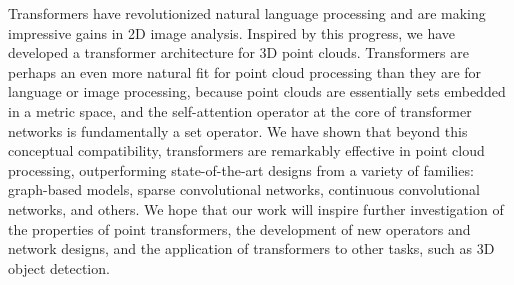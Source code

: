 Transformers have revolutionized natural language processing and are making impressive gains in 2D image analysis. Inspired by this progress, we have developed a transformer architecture for 3D point clouds. Transformers are perhaps an even more natural fit for point cloud processing than they are for language or image processing, because point clouds are essentially sets embedded in a metric space, and the self-attention operator at the core of transformer networks is fundamentally a set operator. We have shown that beyond this conceptual compatibility, transformers are remarkably effective in point cloud processing, outperforming state-of-the-art designs from a variety of families: graph-based models, sparse convolutional networks, continuous convolutional networks, and others. We hope that our work will inspire further investigation of the properties of point transformers, the development of new operators and network designs, and the application of transformers to other tasks, such as 3D object detection.